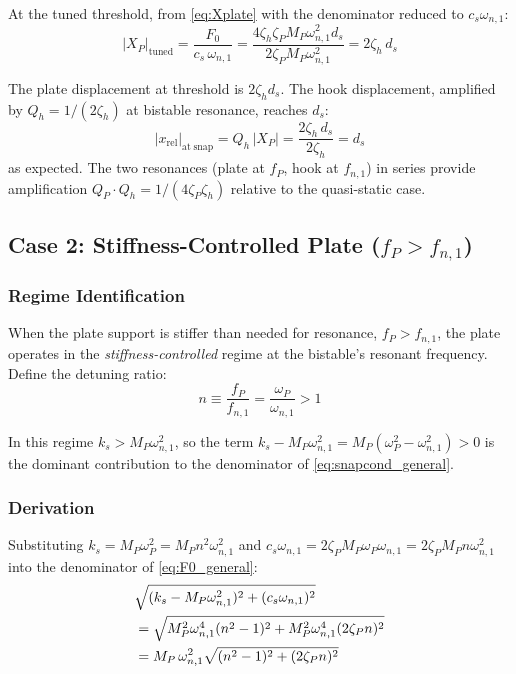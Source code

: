 \documentclass[11pt,letterpaper]{article}
\begin{document}
At the tuned threshold, from \cref{eq:Xplate} with the denominator reduced to
$c_s\omega_{n,1}$:
\begin{equation}
  |X_P|_{\mathrm{tuned}} = \frac{F_0}{c_s\,\omega_{n,1}}
  = \frac{4\zeta_h\zeta_P M_P \omega_{n,1}^2 d_s}{2\zeta_P M_P \omega_{n,1}^2}
  = 2\zeta_h\,d_s
  \label{eq:Xplate_tuned}
\end{equation}

The plate displacement at threshold is $2\zeta_h d_s$. The hook displacement,
amplified by $Q_h = 1/(2\zeta_h)$ at bistable resonance, reaches $d_s$:
\begin{equation}
  |x_{\mathrm{rel}}|_{\mathrm{at\;snap}} = Q_h\,\bigl|X_P\bigr| = \frac{2\zeta_h\,d_s}{2\zeta_h} = d_s
  \label{eq:xrel_check}
\end{equation}
as expected. The two resonances (plate at $f_P$, hook at $f_{n,1}$) in series provide
amplification $Q_P \cdot Q_h = 1/(4\zeta_P\zeta_h)$ relative to the quasi-static case.

\subsection{Case 2: Stiffness-Controlled Plate (\texorpdfstring{$f_P > f_{n,1}$}{fP > fn1})}
\label{ssec:case2}

\subsubsection{Regime Identification}

When the plate support is stiffer than needed for resonance, $f_P > f_{n,1}$, the
plate operates in the \emph{stiffness-controlled} regime at the bistable's resonant
frequency. Define the detuning ratio:
\begin{equation}
  n \equiv \frac{f_P}{f_{n,1}} = \frac{\omega_P}{\omega_{n,1}} > 1
  \label{eq:n_def}
\end{equation}

In this regime $k_s > M_P\omega_{n,1}^2$, so the term
$k_s - M_P\omega_{n,1}^2 = M_P(\omega_P^2 - \omega_{n,1}^2) > 0$ is the dominant
contribution to the denominator of \cref{eq:snapcond_general}.

\subsubsection{Derivation}

Substituting $k_s = M_P\omega_P^2 = M_P n^2\omega_{n,1}^2$ and
$c_s\omega_{n,1} = 2\zeta_P M_P\omega_P\omega_{n,1} = 2\zeta_P M_P n \omega_{n,1}^2$
into the denominator of \cref{eq:F0_general}:
\begin{align}
  &\sqrt{(k_s - M_P\omega_{n,1}^2)^2 + (c_s\omega_{n,1})^2} \notag\\
  &= \sqrt{M_P^2\omega_{n,1}^4(n^2-1)^2 + M_P^2\omega_{n,1}^4(2\zeta_P n)^2}
  \notag\\
  &= M_P\,\omega_{n,1}^2\sqrt{(n^2-1)^2 + (2\zeta_P n)^2}
  \label{eq:denom_case2}
\end{align}
\end{document}
